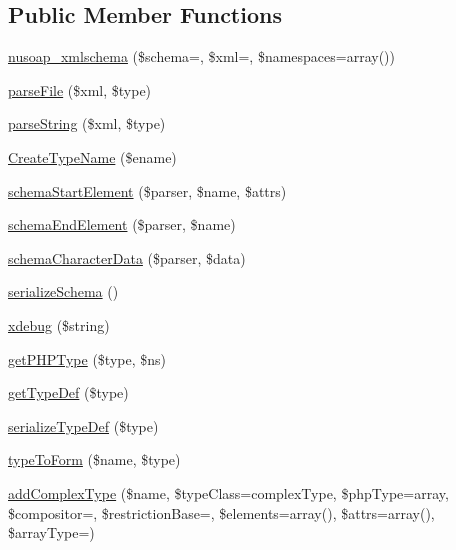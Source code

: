 \subsection*{Public Member Functions}
\begin{DoxyCompactItemize}
\item 
\hyperlink{classnusoap__xmlschema_ae570ce5817d4c4488317ff0fa63d4a8e}{nusoap\+\_\+xmlschema} (\$schema=\textquotesingle{}\textquotesingle{}, \$xml=\textquotesingle{}\textquotesingle{}, \$namespaces=array())
\item 
\hyperlink{classnusoap__xmlschema_a4495d09bfd675f7fbd6b6918ecc84795}{parse\+File} (\$xml, \$type)
\item 
\hyperlink{classnusoap__xmlschema_ad3efb7e0aa9ceb47b09783473a7deae6}{parse\+String} (\$xml, \$type)
\item 
\hyperlink{classnusoap__xmlschema_a8eeebc3af32c4ddcc96b891dffeb5b32}{Create\+Type\+Name} (\$ename)
\item 
\hyperlink{classnusoap__xmlschema_abe761abcfe8369fb87739c8d776eead0}{schema\+Start\+Element} (\$parser, \$name, \$attrs)
\item 
\hyperlink{classnusoap__xmlschema_a8e536da75a8a0d3f44d6d275ff4229c9}{schema\+End\+Element} (\$parser, \$name)
\item 
\hyperlink{classnusoap__xmlschema_af69d1aa4838f91acf8066b8f33e2a016}{schema\+Character\+Data} (\$parser, \$data)
\item 
\hyperlink{classnusoap__xmlschema_ae1f5bc3d8e49c4592e8d00d7890f3e47}{serialize\+Schema} ()
\item 
\hyperlink{classnusoap__xmlschema_af7f8d34ac5331189b07d83cb9fa5f4e9}{xdebug} (\$string)
\item 
\hyperlink{classnusoap__xmlschema_aebfbaab31cdb69fabf5a7c5f2bbd605b}{get\+P\+H\+P\+Type} (\$type, \$ns)
\item 
\hyperlink{classnusoap__xmlschema_a4d3354e230b2cbe9cbf168665ef0a79d}{get\+Type\+Def} (\$type)
\item 
\hyperlink{classnusoap__xmlschema_a6ede91c15c6a31e99181cd698f06365c}{serialize\+Type\+Def} (\$type)
\item 
\hyperlink{classnusoap__xmlschema_ad829fa57be032e351ebf74b60918c8ba}{type\+To\+Form} (\$name, \$type)
\item 
\hyperlink{classnusoap__xmlschema_a8086789ccd44f879ab77ba98dfa08aa2}{add\+Complex\+Type} (\$name, \$type\+Class=\textquotesingle{}complex\+Type\textquotesingle{}, \$php\+Type=\textquotesingle{}array\textquotesingle{}, \$compositor=\textquotesingle{}\textquotesingle{}, \$restriction\+Base=\textquotesingle{}\textquotesingle{}, \$elements=array(), \$attrs=array(), \$array\+Type=\textquotesingle{}\textquotesingle{})

\end{DoxyCompactItemize}
